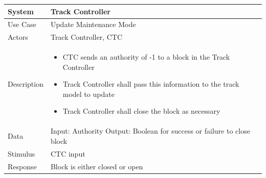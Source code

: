 \documentclass{article}
\begin{document}
    \begin{longtable}{
    || >{\raggedright\arraybackslash}m{}
    | >{\raggedright\arraybackslash}m{}||}
    \hline
    \textbf{System} & \textbf{Track Controller} \\
    \hline
    Use Case & Update Maintenance Mode\\
    \hline
    Actors & Track Controller, CTC \\
    \hline
    Description & \begin{itemize}
        \item CTC sends an authority of -1 to a block in the Track Controller
        \item Track Controller shall pass this information to the track model to update
        \item Track Controller shall close the block as necessary
    \end{itemize}\\
    \hline
    Data & Input: Authority \newline Output: Boolean for success or failure to close block\\
    \hline
    Stimulus & CTC input\\
    \hline
    Response & Block is either closed or open\\
    \hline
    \end{longtable}
\end{document}
